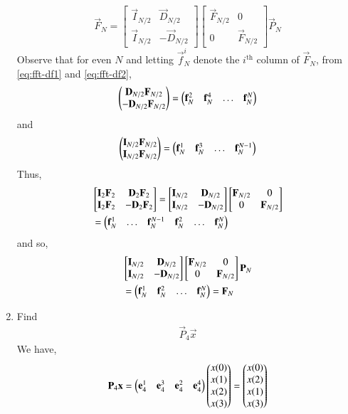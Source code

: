\documentclass[journal,12pt,twocolumn]{IEEEtran}
\renewcommand\thesection{\arabic{section}}
\begin{document}
\begin{enumerate}[label=\arabic*.,ref=\thesection.\theenumi]
\begin{equation}
\vec{F}_{N}=
\begin{bmatrix}
\vec{I}_{N/2} & \vec{D}_{N/2} \\
\vec{I}_{N/2} & -\vec{D}_{N/2}
\end{bmatrix}
\begin{bmatrix}
\vec{F}_{N/2} & 0 \\
0 & \vec{F}_{N/2}
\end{bmatrix}
\vec{P}_{N}
\end{equation}
\solution Observe that for even $N$ and letting $\vec{f}_N^i$ denote the $i^{\text{th}}$ column of $\vec{F}_N$, from \eqref{eq:fft-df1} and \eqref{eq:fft-df2},
\begin{align}
	\begin{pmatrix}\mathbf{D}_{N/2}\mathbf{F}_{N/2} \\ -\mathbf{D}_{N/2}\mathbf{F}_{N/2}\end{pmatrix} = \begin{pmatrix}\mathbf{f}_N^{2} & \mathbf{f}_N^{4} & \ldots & \mathbf{f}_N^{N}\end{pmatrix}
\end{align}
and
\begin{align}
	\begin{pmatrix}\mathbf{I}_{N/2}\mathbf{F}_{N/2} \\ \mathbf{I}_{N/2}\mathbf{F}_{N/2}\end{pmatrix} = \begin{pmatrix}\mathbf{f}_N^{1} & \mathbf{f}_N^{3} & \ldots & \mathbf{f}_N^{N - 1}\end{pmatrix}
\end{align}
Thus,
\begin{align}
	&\begin{bmatrix}\mathbf{I}_2\mathbf{F}_2 & \mathbf{D}_2\mathbf{F}_2 \\ \mathbf{I}_2\mathbf{F}_2 & -\mathbf{D}_2\mathbf{F}_2\end{bmatrix} = \begin{bmatrix}\mathbf{I}_{N/2} & \mathbf{D}_{N/2} \\ \mathbf{I}_{N/2} & -\mathbf{D}_{N/2}\end{bmatrix}\begin{bmatrix}\mathbf{F}_{N/2} & 0 \\ 0 & \mathbf{F}_{N/2}\end{bmatrix} \nonumber \\
	&= \begin{pmatrix}\mathbf{f}_N^{1} & \ldots & \mathbf{f}_N^{N - 1} & \mathbf{f}_N^{2} & \ldots & \mathbf{f}_N^{N}\end{pmatrix}
\end{align}
and so,
\begin{align}
	&\begin{bmatrix}\mathbf{I}_{N/2} & \mathbf{D}_{N/2} \\ \mathbf{I}_{N/2} & -\mathbf{D}_{N/2}\end{bmatrix}\begin{bmatrix}\mathbf{F}_{N/2} & 0 \\ 0 & \mathbf{F}_{N/2}\end{bmatrix}\mathbf{P}_{N} \nonumber \\
	&= \begin{pmatrix}\mathbf{f}_N^{1} & \mathbf{f}_N^{2} & \ldots & \mathbf{f}_N^{N}\end{pmatrix} = \mathbf{F}_N
\end{align}
\item Find 
    \begin{align}
	     \vec{P}_4 \vec{x}
    \end{align}
\solution We have,
\begin{align}
	\vec{P}_4\vec{x} = \myvec{\vec{e}_4^1 & \vec{e}_4^3 & \vec{e}_4^2 & \vec{e}_4^4}\myvec{x(0)\\x(1)\\x(2)\\x(3)} = \myvec{x(0)\\x(2)\\x(1)\\x(3)}

\end{align}
\end{enumerate}
\end{document}
